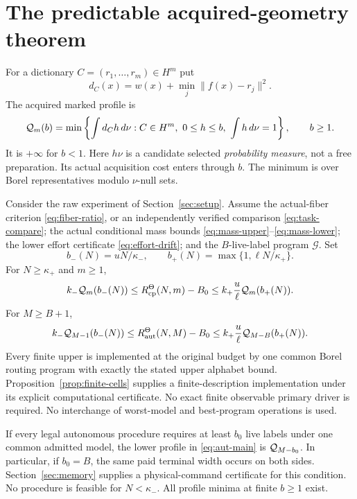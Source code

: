 \section{The predictable acquired-geometry theorem}
\label{sec:main}
For a dictionary $C=(r_1,\ldots,r_m)\in H^m$ put
\[
 d_C(x)=w(x)+\min_j\|f(x)-r_j\|^2.
\]
The acquired marked profile is
\begin{equation}\label{eq:profile}
 \mathcal Q_m(b)=\min\left\{\int d_C h\,d\nu:
       C\in H^m,\ 0\le h\le b,\ \int h\,d\nu=1\right\},\qquad b\ge1.
\end{equation}
It is $+\infty$ for $b<1$. Here $h\nu$ is a candidate selected \emph{probability measure}, not a free preparation. Its actual acquisition cost enters through $b$. The minimum is over Borel representatives modulo $\nu$-null sets.

\begin{theorem}\label{thm:main}
Consider the raw experiment of Section~\ref{sec:setup}. Assume the actual-fiber criterion \eqref{eq:fiber-ratio}, or an independently verified comparison \eqref{eq:task-compare}; the actual conditional mass bounds \eqref{eq:mass-upper}--\eqref{eq:mass-lower}; the lower effort certificate \eqref{eq:effort-drift}; and the $B$-live-label program $\mathcal G$. Set
\[
 b_-(N)=uN/\kappa_-,\qquad
 b_+(N)=\max\{1,\ell N/\kappa_+\}.
\]
For $N\ge\kappa_+$ and $m\ge1$,
\begin{equation}\label{eq:cp-main}
 k_-\mathcal Q_m(b_-(N))\le R_{\mathrm{cp}}^\Theta(N,m)-B_0
       \le k_+\frac u\ell\mathcal Q_m(b_+(N)).
\end{equation}
For $M\ge B+1$,
\begin{equation}\label{eq:aut-main}
 k_-\mathcal Q_{M-1}(b_-(N))\le R_{\mathrm{aut}}^\Theta(N,M)-B_0
       \le k_+\frac u\ell\mathcal Q_{M-B}(b_+(N)).
\end{equation}
Every finite upper is implemented at the original budget by one common Borel routing program with exactly the stated upper alphabet bound. Proposition~\ref{prop:finite-cells} supplies a finite-description implementation under its explicit computational certificate. No exact finite observable primary driver is required. No interchange of worst-model and best-program operations is used.

If every legal autonomous procedure requires at least $b_0$ live labels under one common admitted model, the lower profile in \eqref{eq:aut-main} is $\mathcal Q_{M-b_0}$. In particular, if $b_0=B$, the same paid terminal width occurs on both sides. Section~\ref{sec:memory} supplies a physical-command certificate for this condition. No procedure is feasible for $N<\kappa_-$. All profile minima at finite $b\ge1$ exist.
\end{theorem}

